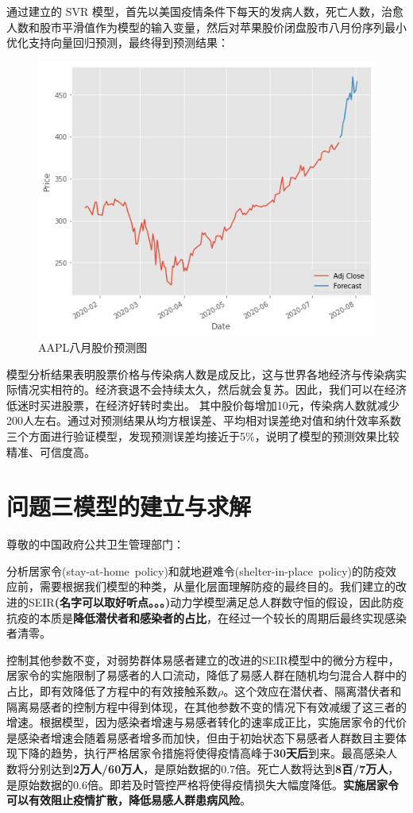 \documentclass{whutmod}
\begin{document}
通过建立的 SVR 模型，首先以美国疫情条件下每天的发病人数，死亡人数，治愈人数和股市平滑值作为模型的输入变量，然后对苹果股价闭盘股市八月份序列最小优化支持向量回归预测，最终得到预测结果：
           \begin{figure}[H]
   	\centering
   	\includegraphics[width=.8\textwidth]{figures/A5.png}
   	\caption{AAPL八月股价预测图}
   \end{figure}

模型分析结果表明股票价格与传染病人数是成反比，这与世界各地经济与传染病实际情况实相符的。经济衰退不会持续太久，然后就会复苏。因此，我们可以在经济低迷时买进股票，在经济好转时卖出。 其中股价每增加10元，传染病人数就减少200人左右。通过对预测结果从均方根误差、平均相对误差绝对值和纳什效率系数三个方面进行验证模型，发现预测误差均接近于5\%，说明了模型的预测效果比较精准、可信度高。

	
    \section{问题三模型的建立与求解}
		尊敬的中国政府公共卫生管理部门：
		
		分析居家令(stay-at-home\ policy)和就地避难令(shelter-in-place\ policy)的防疫效应前，需要根据我们模型的种类，从量化层面理解防疫的最终目的。我们建立的改进的SEIR\textbf{(名字可以取好听点。。。)}动力学模型满足总人群数守恒的假设，因此防疫抗疫的本质是\textbf{降低潜伏者和感染者的占比}，在经过一个较长的周期后最终实现感染者清零。
		
		控制其他参数不变，对弱势群体易感者建立的改进的SEIR模型中的微分方程中，居家令的实施限制了易感者的人口流动，降低了易感人群在随机均匀混合人群中的占比，即有效降低了方程中的有效接触系数$\rho$。这个效应在潜伏者、隔离潜伏者和隔离易感者的控制方程中得到体现，在其他参数不变的情况下有效减缓了这三者的增速。根据模型，因为感染者增速与易感者转化的速率成正比，实施居家令的代价是感染者增速会随着易感者增多而加快，但由于初始状态下易感者人群数目主要体现下降的趋势，执行严格居家令措施将使得疫情高峰于\textbf{30天后}到来。最高感染人数将分别达到\textbf{2万人/60万人}，是原始数据的0.7倍。死亡人数将达到\textbf{8百/7万人}，是原始数据的0.6倍。即若及时管控严格将使得疫情损失大幅度降低。\textbf{实施居家令可以有效阻止疫情扩散，降低易感人群患病风险}。
		
\end{document}
